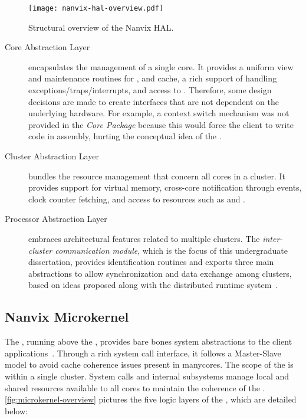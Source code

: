 		\begin{figure}[!tb]
			\centering%
			\caption{Structural overview of the Nanvix HAL.}%
			\label{fig:hal-overview}%
			\texttt{[image: nanvix-hal-overview.pdf]}%
		\end{figure}

		\begin{description}

			\item[Core Abstraction Layer]
				encapsulates the management of a single core.
				It provides a uniform view and maintenance routines for \tlbs, \mmu and cache,
				a rich support of handling exceptions/traps/interrupts, and
				access to \pmio.
				Therefore, some design decisions are made to create interfaces that are not
				dependent on the underlying hardware.
				For example, a context switch mechanism was not provided in the
				\textit{Core Package} because this would force the client \os
				to write code in assembly, hurting the conceptual idea of the \hal.

			\item[Cluster Abstraction Layer]
				bundles the resource management that concern all cores in a cluster.
				It provides support for virtual memory, cross-core notification through events,
				clock counter fetching, and access to \io resources such as \mmio and \dma.

			\item[Processor Abstraction Layer]
				embraces architectural features related to multiple clusters.
				The \textit{inter-cluster communication module}, which is the focus of
				this undergraduate dissertation, provides \noc identification routines and
				exports three main abstractions to allow synchronization and data
				exchange among clusters, based on ideas proposed along with the
				\nodeos distributed runtime system~\cite{DeDinechin2013-1}.

		\end{description}

	\subsection{Nanvix Microkernel}
	\label{sec.microkernel}

		The \nanvix \microkernel, running above the \hal, provides
		bare bones system abstractions to the client applications~\cite{penna:sbesc19}.
		Through a rich system call interface, it follows a Master-Slave \os model
		to avoid cache coherence issues present in manycores.
		The scope of the \microkernel is within a single cluster.
		System calls and internal subsystems manage local and shared resources
		available to all cores to maintain the coherence of the \os.
		\autoref{fig:microkernel-overview} pictures the five logic layers of the \microkernel,
		which are detailed below:

